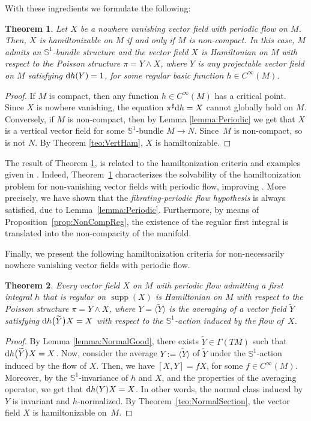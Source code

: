 \documentclass[pdftex]{sigma}%
\newcommand{\dd}{{\rm d}}
\numberwithin{equation}{section}
\newtheorem{Theorem}{Theorem}[section]
\begin{document}
With these ingredients we formulate the following:

\begin{Theorem}\label{teo:Periodic}
Let $X$ be a nowhere vanishing vector field with periodic flow on $M$. Then, $X$ is hamiltonizable on $M$ if and only if $M$ is non-compact. In this case, $M$ admits an $\mathbb{S}^1$-bundle structure and the vector field $X$ is Hamiltonian on $M$ with respect to the Poisson structure $\pi = Y \wedge X$, where $Y$ is any projectable vector field on $M$ satisfying $\dd{h}(Y)=1$, for some regular basic function $h \in C^{\infty}(M)$.
\end{Theorem}
\begin{proof}
If $M$ is compact, then any function $h \in C^{\infty}(M)$ has a critical point. Since $X$ is nowhere vanishing, the equation $\pi^{\sharp}\dd h = X$ cannot globally hold on $M$. Conversely, if $M$ is non-compact, then by Lemma \ref{lemma:Periodic} we get
that $X$ is a vertical vector field for some $\mathbb{S}^1$-bundle $M \to N$. Since~$M$ is non-compact, so is not $N$. By Theorem \ref{teo:VertHam}, $X$ is hamiltonizable.
\end{proof}

The result of Theorem \ref{teo:Periodic}, is related to the hamiltonization criteria and examples given in \cite{FGS-05}. Indeed, Theorem~\ref{teo:Periodic} characterizes the solvability of the hamiltonization problem for non-vanishing vector fields with periodic flow, improving \cite[Theorem~1]{FGS-05}. More precisely, we have shown that the \emph{fibrating-periodic flow hypothesis} is always satisfied, due to Lem\-ma~\ref{lemma:Periodic}. Furthermore, by means of Proposition~\ref{prop:NonCompReg}, the existence of the regular first integral is translated into the non-compacity of the manifold.

Finally, we present the following hamiltonization criteria for non-necessarily nowhere vani\-shing vector fields with periodic flow.

\begin{Theorem}\label{teo:Periodic2}
Every vector field $X$ on $M$ with periodic flow admitting a first integral $h$ that is regular on $\operatorname{supp}(X)$ is Hamiltonian on $M$ with respect to the Poisson structure $\pi = Y \wedge X$, where $Y = \big\langle \widetilde{Y} \big\rangle$ is the averaging of a vector field $\widetilde{Y}$ satisfying $\dd h\big(\widetilde{Y}\big)X = X$ with respect to the $\mathbb{S}^1$-action induced by the flow of~$X$.
\end{Theorem}
\begin{proof}
By Lemma \ref{lemma:NormalGood}, there exists $\widetilde{Y} \in \Gamma(TM)$ such that $\dd h\big(\widetilde{Y}\big)X = X$. Now, consider the average $Y := \big\langle \widetilde{Y} \big\rangle$ of $\widetilde{Y}$ under the $\mathbb{S}^{1}$-action induced by the flow of $X$. Then, we have $[X,Y]=fX$, for some $f \in C^{\infty}(M)$. Moreover, by the $\mathbb{S}^{1}$-invariance of $h$ and $X$, and the properties of the averaging operator, we get that $\dd h(Y)X = X$. In other words, the normal class induced by $Y$ is invariant and $h$-normalized. By Theorem~\ref{teo:NormalSection}, the vector field $X$ is hamiltonizable on~$M$.
\end{proof}
\end{document}
